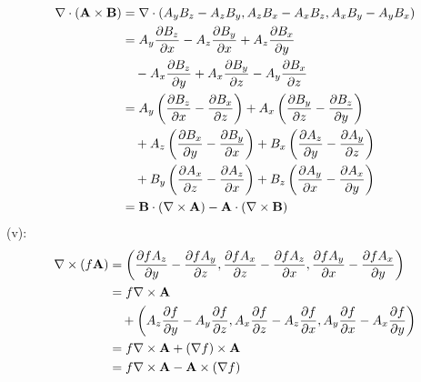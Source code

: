                 \begin{equation}
                    \begin{aligned}
                        \nabla\cdot(\mathbf{A}\times\mathbf{B}) &=\nabla\cdot(A_y B_z - A_z B_y, A_z B_x - A_x B_z, A_x B_y - A_y B_x) \\
                        &=A_y \frac{\partial B_z}{\partial x} - A_z \frac{\partial B_y}{\partial x} + A_z\frac{\partial B_x}{\partial y}\\
                        &\quad -A_x\frac{\partial B_z}{\partial y} +A_x\frac{\partial B_y}{\partial z} - A_y \frac{\partial B_x}{\partial z} \\
                        &=A_y\left(\frac{\partial B_z}{\partial x} - \frac{\partial B_x}{\partial z}\right) + A_x\left(\frac{\partial B_y}{\partial z} - \frac{\partial B_z}{\partial y}\right) \\
                        &\quad+ A_z\left(\frac{\partial B_x}{\partial y} - \frac{\partial B_y}{\partial x}\right) + B_x\left(\frac{\partial A_z}{\partial y} - \frac{\partial A_y}{\partial z}\right) \\
                        &\quad+ B_y\left(\frac{\partial A_x}{\partial z} - \frac{\partial A_z}{\partial x}\right) + B_z\left(\frac{\partial A_y}{\partial x} - \frac{\partial A_x}{\partial y}\right) \\
                        &=\mathbf{B}\cdot(\nabla\times\mathbf{A}) - \mathbf{A}\cdot(\nabla\times\mathbf{B})
                    \end{aligned}
                \end{equation}
                (v):
                \begin{equation}
                    \begin{aligned}
                        \nabla\times(f\mathbf{A}) &= \left(\frac{\partial fA_z}{\partial y} - \frac{\partial fA_y}{\partial z}, \frac{\partial fA_x}{\partial z} - \frac{\partial fA_z}{\partial x}, \frac{\partial fA_y}{\partial x} - \frac{\partial fA_x}{\partial y}\right) \\
                        &=f\nabla\times\mathbf{A} \\
                        &\quad + \left(A_z\frac{\partial f}{\partial y} - A_y\frac{\partial f}{\partial z}, A_x\frac{\partial f}{\partial z} - A_z\frac{\partial f}{\partial x}, A_y\frac{\partial f}{\partial x} - A_x\frac{\partial f}{\partial y}\right) \\
                        &=f\nabla\times\mathbf{A} + \left(\nabla f\right)\times\mathbf{A} \\
                        &=f\nabla\times\mathbf{A} - \mathbf{A}\times(\nabla f)
                    \end{aligned}
                \end{equation}

